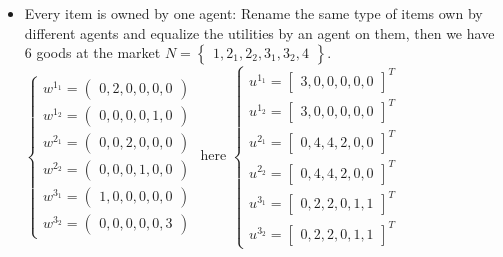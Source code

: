 \documentclass{article}
\newenvironment{answer}{\par\color{ForestGreen}}{\par}
\begin{document}
\begin{answer}
\begin{itemize}
\begin{itemize}
      \item Every item is owned by one agent: Rename the same type of items own by different agents and equalize the utilities by an agent on them, then we have
      6 goods at the market $ N = \begin{Bmatrix} 1,2_1, 2_2, 3_1, 3_2, 4 \end{Bmatrix}$.
      $\begin{cases}
         w^{1_1} = \begin{pmatrix} 0, 2, 0, 0, 0, 0 \end{pmatrix} \\
         w^{1_2} = \begin{pmatrix} 0, 0, 0, 0, 1, 0 \end{pmatrix} \\
         w^{2_1} = \begin{pmatrix} 0, 0, 2, 0, 0, 0 \end{pmatrix} \\
         w^{2_2} = \begin{pmatrix} 0, 0, 0, 1, 0, 0 \end{pmatrix} \\
         w^{3_1} = \begin{pmatrix} 1, 0, 0, 0, 0, 0 \end{pmatrix} \\
         w^{3_2} = \begin{pmatrix} 0, 0, 0, 0, 0, 3 \end{pmatrix}
       \end{cases} $
       here
      $\begin{cases}
         u^{1_1} = \begin{bmatrix} 3, 0, 0, 0, 0, 0\end{bmatrix}^T \\
         u^{1_2} = \begin{bmatrix} 3, 0, 0, 0, 0, 0\end{bmatrix}^T \\
         u^{2_1} = \begin{bmatrix} 0, 4, 4, 2, 0, 0\end{bmatrix}^T \\
         u^{2_2} = \begin{bmatrix} 0, 4, 4, 2, 0, 0\end{bmatrix}^T \\
         u^{3_1} = \begin{bmatrix} 0, 2, 2, 0, 1, 1\end{bmatrix}^T \\
         u^{3_2} = \begin{bmatrix} 0, 2, 2, 0, 1, 1\end{bmatrix}^T
       \end{cases} $


\end{itemize}
\end{itemize}
\end{answer}
\end{document}
